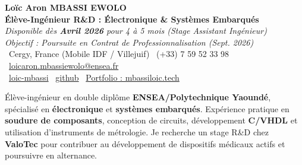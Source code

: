 \documentclass[a4paper,11pt]{article}
\begin{document}
\begin{center}
    {\Large \textbf{Loïc Aron MBASSI EWOLO}} \\ \vspace{4pt}
    \textbf{\large Élève-Ingénieur R\&D : Électronique \& Systèmes Embarqués} \\
    \textit{\small Disponible dès \textbf{Avril 2026} pour 4 à 5 mois (Stage Assistant Ingénieur)}\\
    \textit{\small Objectif : Poursuite en Contrat de Professionnalisation (Sept. 2026)}\\
    \vspace{4pt}
    \small
    \faMapMarker\ Cergy, France (Mobile IDF / Villejuif) \quad
    \faPhone\ (+33) 7 59 52 33 98 \quad
    \faEnvelope\ \href{mailto:loicaron.mbassiewolo@ensea.fr}{loicaron.mbassiewolo@ensea.fr} \\ \vspace{2pt}
    \faLinkedin\ \href{https://www.linkedin.com/in/loic-mbassi}{loic-mbassi} \quad
    \faGithub\ \href{https://github.com/Nameless0l}{github} \quad
    \faGlobe\ \href{https://mbassiloic.tech/\#portfolio}{Portfolio : mbassiloic.tech}
\end{center}

\vspace{-6pt}

\noindent\small{Élève-ingénieur en double diplôme \textbf{ENSEA/Polytechnique Yaoundé}, spécialisé en \textbf{électronique} et \textbf{systèmes embarqués}. Expérience pratique en \textbf{soudure de composants}, conception de circuits, développement \textbf{C/VHDL} et utilisation d'instruments de métrologie. Je recherche un stage R\&D chez \textbf{ValoTec} pour contribuer au développement de dispositifs médicaux actifs et poursuivre en alternance.}

\end{document}
